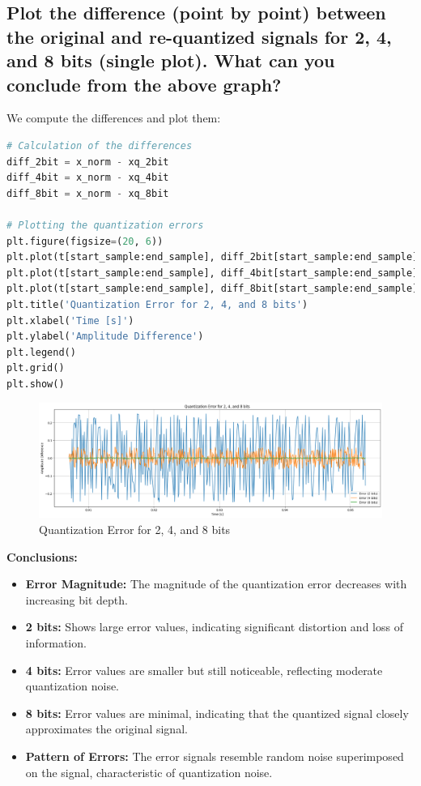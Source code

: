 \documentclass[10pt]{article}
\theoremstyle{definition}
\theoremstyle{remark}
\theoremstyle{definition}
\numberwithin{equation}{prob}
\begin{document}
\subsection{Plot the difference (point by point) between the original and re-quantized signals for 2, 4, and 8 bits (single plot). What can you conclude from the above graph?}

We compute the differences and plot them:

\begin{lstlisting}[language=Python]
# Calculation of the differences
diff_2bit = x_norm - xq_2bit
diff_4bit = x_norm - xq_4bit
diff_8bit = x_norm - xq_8bit

# Plotting the quantization errors
plt.figure(figsize=(20, 6))
plt.plot(t[start_sample:end_sample], diff_2bit[start_sample:end_sample], label='Error (2 bits)')
plt.plot(t[start_sample:end_sample], diff_4bit[start_sample:end_sample], label='Error (4 bits)')
plt.plot(t[start_sample:end_sample], diff_8bit[start_sample:end_sample], label='Error (8 bits)')
plt.title('Quantization Error for 2, 4, and 8 bits')
plt.xlabel('Time [s]')
plt.ylabel('Amplitude Difference')
plt.legend()
plt.grid()
plt.show()
\end{lstlisting}

\begin{figure}[H]
\centering
\includegraphics[width=1\textwidth]{./figures/quantization_error.png}
\caption{Quantization Error for 2, 4, and 8 bits}
\end{figure}

\textbf{Conclusions:}

\begin{itemize}
    \item \textbf{Error Magnitude:} The magnitude of the quantization error decreases with increasing bit depth.
    \item \textbf{2 bits:} Shows large error values, indicating significant distortion and loss of information.
    \item \textbf{4 bits:} Error values are smaller but still noticeable, reflecting moderate quantization noise.
    \item \textbf{8 bits:} Error values are minimal, indicating that the quantized signal closely approximates the original signal.
    \item \textbf{Pattern of Errors:} The error signals resemble random noise superimposed on the signal, characteristic of quantization noise.
\end{itemize}
\end{document}
